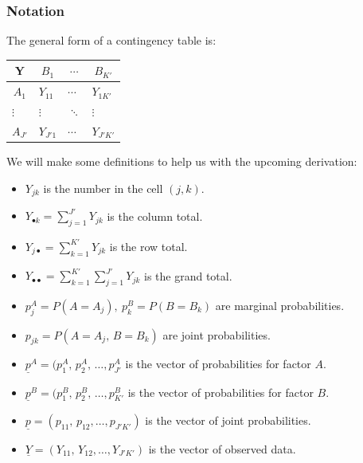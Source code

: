 \documentclass[12pt]{article}
\begin{document}
\subsubsection{Notation}
The general form of a contingency table is:
\begin{table}[H]
\centering
\begin{tabular}{l|lll}
\multicolumn{1}{c|}{Y}       & \multicolumn{1}{c}{\(B_1\)} & \multicolumn{1}{c}{\(\cdots\)} & \multicolumn{1}{c}{\(B_{K'}\)} \\ \hline
\multicolumn{1}{c|}{\(A_1\)} & \(Y_{11}\)                  & \(\cdots\)                     & \(Y_{1K'}\)                    \\
\(\vdots\)                   & \(\vdots\)                  & \(\ddots\)                     & \(\vdots\)                     \\
\(A_{J'}\)                   & \(Y_{J'1}\)                 & \(\cdots\)                     & \(Y_{J'K'}\)                  
\end{tabular}
\end{table}
We will make some definitions to help us with the upcoming derivation:
\begin{itemize}
    \item \(Y_{jk}\) is the number in the cell \((j,k)\).
    \item \(Y_{\bullet k}=\sum^{J'}_{j=1}Y_{jk}\) is the column total.
    \item \(Y_{j\bullet}=\sum^{K'}_{k=1}Y_{jk}\) is the row total.
    \item \(Y_{\bullet\bullet}=\sum^{K'}_{k=1}\sum^{J'}_{j=1}Y_{jk}\) is the grand total.
    \item \(p_j^A=P(A=A_j),\ p_k^B=P(B=B_k)\) are marginal probabilities.
    \item \(p_{jk}=P(A=A_j,\,B=B_k)\) are joint probabilities.
    \item \(\underline{p}^A=(p_1^A,\,p_2^A,\,\dots,p_{J'}^A\) is the vector of probabilities for factor \(A\).
    \item \(\underline{p}^B=(p_1^B,\,p_2^B,\,\dots,p_{K'}^B\) is the vector of probabilities for factor \(B\).
    \item \(\underline{p}=(p_{11},\,p_{12},\dots,p_{J'K'})\) is the vector of joint probabilities.
    \item \(\underline{Y}=(Y_{11},\,Y_{12},\dots,Y_{J'K'})\) is the vector of observed data.
\end{itemize}
\end{document}
